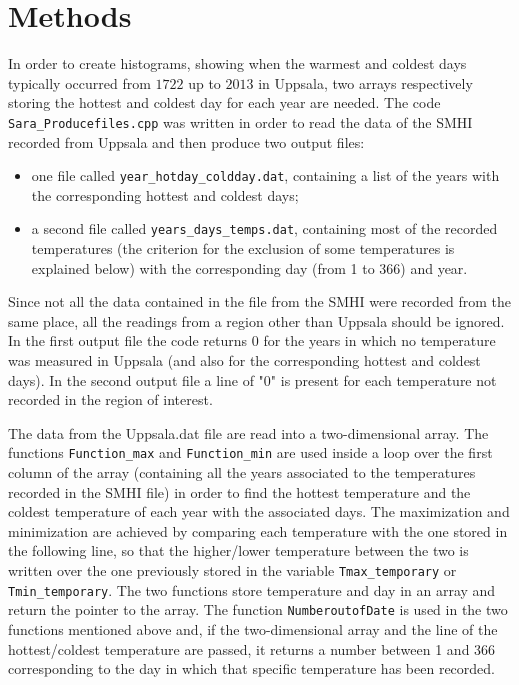 

\section{Methods}\label{sec:Methods}
In order to create histograms, showing when the warmest and coldest days typically occurred from $1722$ up to $2013$ in Uppsala, two
arrays respectively storing the hottest and coldest day for each year are needed. The code \texttt{Sara{\_}Producefiles.cpp} was written in order to read the data of
the SMHI recorded from Uppsala and then produce two output files:
\begin{itemize}
\item one file called \texttt{year\_hotday\_coldday.dat}, containing a list of the years with the corresponding hottest and coldest days; 
\item a second file called \texttt{years\_days\_temps.dat}, containing most of the recorded temperatures (the criterion for the exclusion of some temperatures is explained below) with the corresponding day 
(from 1 to 366) and year.
\end{itemize}
\medskip
Since not all the data contained in the file from the SMHI were  recorded from the same place, all the readings from a region other
than Uppsala should be ignored. In the first output file the code returns $0$  for the years in which no temperature was measured in Uppsala (and also for the corresponding hottest and coldest days). In the second output file a line of "$0$" is present for each temperature not recorded in the region of interest.

\medskip
\medskip
The data from the Uppsala.dat file are read into a two-dimensional array. The functions \texttt{Function{\_}max} and \texttt{Function{\_}min} are used inside a loop over the first column of the array (containing all the years associated to the temperatures recorded in the 
SMHI file) in order to find the hottest temperature and the coldest temperature of each year with the associated days. The maximization
and minimization are achieved by comparing each temperature with the one stored in the following line, so that the higher/lower temperature between the two is written over the one previously stored in the variable \texttt{Tmax\_temporary} or \texttt{Tmin\_temporary}. The two functions store temperature and day in an array and return the pointer to the array. The function \texttt{NumberoutofDate}
is used in the two functions mentioned above and, if the two-dimensional array and the line of the hottest/coldest temperature
are passed, it returns a number between 1 and 366 corresponding to the day in which that specific temperature has been recorded. 

